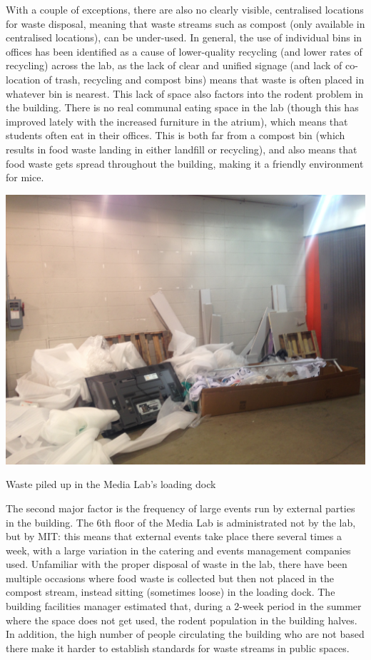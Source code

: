 \documentclass[nofonts,nols,justified,nobib]{tufte-book}
\begin{document}
With a couple of exceptions, there are also no clearly visible, centralised locations for waste disposal, meaning that waste streams such as compost (only available in centralised locations), can be under-used. In general, the use of individual bins in offices has been identified as a cause of lower-quality recycling (and lower rates of recycling) across the lab, as the lack of clear and unified signage (and lack of co-location of trash, recycling and compost bins) means that waste is often placed in whatever bin is nearest. This lack of space also factors into the rodent problem in the building. There is no real communal eating space in the lab (though this has improved lately with the increased furniture in the atrium), which means that students often eat in their offices. This is both far from a compost bin (which results in food waste landing in either landfill or recycling), and also means that food waste gets spread throughout the building, making it a friendly environment for mice.

\begin{marginfigure}
  \includegraphics[width=1\linewidth]{img/2/mit-bins/loading6.JPG}
  \caption{Waste piled up in the Media Lab's loading dock}
\end{marginfigure}

The second major factor is the frequency of large events run by external parties in the building. The 6th floor of the Media Lab is administrated not by the lab, but by MIT: this means that external events take place there several times a week, with a large variation in the catering and events management companies used. Unfamiliar with the proper disposal of waste in the lab, there have been multiple occasions where food waste is collected but then not placed in the compost stream, instead sitting (sometimes loose) in the loading dock. The building facilities manager estimated that, during a 2-week period in the summer where the space does not get used, the rodent population in the building halves. In addition, the high number of people circulating the building who are not based there make it harder to establish standards for waste streams in public spaces.
\end{document}
